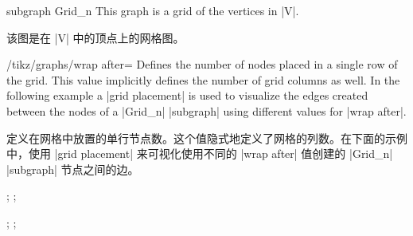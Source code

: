 \begin{graph}{subgraph Grid\_n}
    This graph is a grid of the vertices in |V|.

    该图是在 |V| 中的顶点上的网格图。
    \begin{key}{/tikz/graphs/wrap after=}
        Defines the number of nodes placed in a single row of the grid. This
        value implicitly defines the number of grid columns as well. In the
        following example a |grid placement| is used to visualize the edges
        created between the nodes of a |Grid_n| |subgraph| using different
        values for |wrap after|.

        定义在网格中放置的单行节点数。这个值隐式地定义了网格的列数。在下面的示例中，使用 |grid placement| 来可视化使用不同的 |wrap after| 值创建的 |Grid_n| |subgraph| 节点之间的边。
\begin{codeexample}[preamble={\usetikzlibrary{graphs.standard}}]
\tikz {};
\tikz {};
\end{codeexample}
\begin{codeexample}[preamble={\usetikzlibrary{graphs.standard}}]
\tikz {};
\tikz {};
\end{codeexample}
  \end{key}
\end{graph}

%
%
%
%


